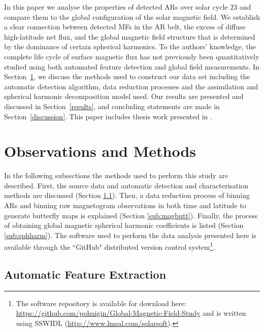 \documentclass[namedreferences]{solarphysics}
\begin{document}
\begin{article}
In this paper we analyse the properties of detected ARs over solar cycle 23 and compare them to the global configuration of the solar magnetic field. %
We establish a clear connection between detected MFs in the AR belt, the excess of diffuse high-latitude net flux, and the global magnetic field structure that is determined by the dominance of certain spherical harmonics. To the authors' knowledge, the complete life cycle of surface magnetic flux has not previously been quantitatively studied using both automated feature detection and global field measurements.  
In Section~\ref{obs_and_meth}, we discuss the methods used to construct our data set including the automatic detection algorithm, data reduction processes and the assimilation and spherical harmonic decomposition model used. Our results are presented and discussed in Section~\ref{results}, and concluding statements are made in Section~\ref{discussion}. This paper includes thesis work presented in  \citet{Higgins:thesis}.


\section{Observations and Methods}\label{obs_and_meth}

In the following subsections the methods used to perform this study are described. First, the source data and automatic detection and characterisation methods are discussed (Section \ref{sub:autofeat}). Then, a data reduction process of binning ARs and binning raw magnetogram observations in both time and latitude to generate butterfly maps is explained (Section \ref{sub:magbutt}). Finally, the process of obtaining global magnetic spherical harmonic coefficients is listed (Section \ref{sub:sphharm}). The software used to perform the data analysis presented here is available through the ``GitHub" distributed version control system\footnote{The software repository is available for download here: \url{https://github.com/pohuigin/Global-Magnetic-Field-Study} and is written using SSWIDL (\url{http://www.lmsal.com/solarsoft}).}.


\subsection{Automatic Feature Extraction}\label{sub:autofeat}


\end{article}
\end{document}

